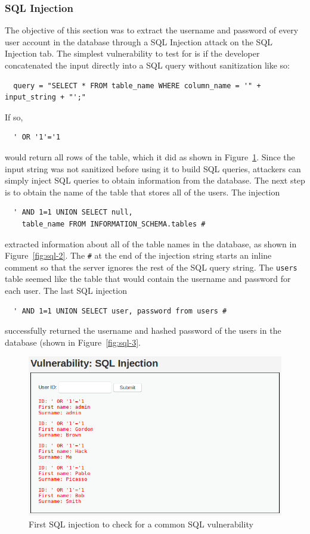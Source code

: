 \documentclass[11pt]{article}
\begin{document}
\subsubsection*{SQL Injection}
The objective of this section was to extract the username and password of every user account in the database
through a SQL Injection attack on the SQL Injection tab.
The simplest vulnerability to test for is if the developer concatenated the input directly into a SQL query without sanitization like so:
\begin{verbatim}
  query = "SELECT * FROM table_name WHERE column_name = '" + input_string + "';"
\end{verbatim}
If so,
\begin{verbatim}
  ' OR '1'='1
\end{verbatim}
would return all rows of the table, which it did as shown in Figure~\ref{fig:sql-1}.
Since the input string was not sanitized before using it to build SQL queries,
attackers can simply inject SQL queries to obtain information from the database.
The next step is to obtain the name of the table that stores all of the users.
The injection
\begin{verbatim}
  ' AND 1=1 UNION SELECT null,
    table_name FROM INFORMATION_SCHEMA.tables #
\end{verbatim}
extracted information about all of the table names in the database, as shown in Figure~\ref{fig:sql-2}.
The \verb|#| at the end of the injection string starts an inline comment so that the server ignores the rest of the SQL query string.
The \verb|users| table seemed like the table that would contain the username and password for each user.
The last SQL injection
\begin{verbatim}
  ' AND 1=1 UNION SELECT user, password from users #
\end{verbatim}
successfully returned the username and hashed password of the users in the database (shown in Figure~\ref{fig:sql-3}.
\begin{figure}[htbp]
  \centering
  \includegraphics[width=1\linewidth]{./sql-1.png}
  \caption{\label{fig:sql-1}
  First SQL injection to check for a common SQL vulnerability}
\end{figure}
\end{document}
